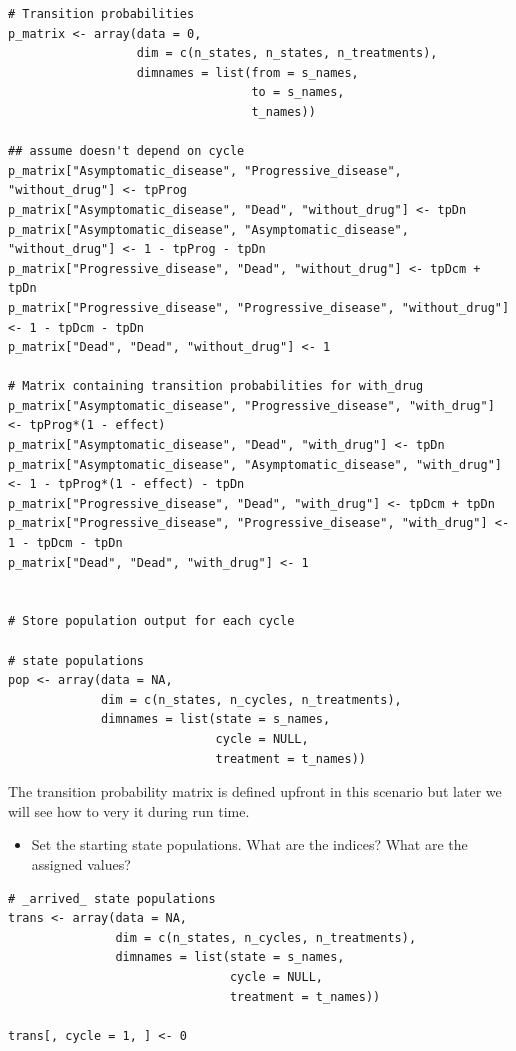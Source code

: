 \begin{verbatim}
# Transition probabilities
p_matrix <- array(data = 0,
                  dim = c(n_states, n_states, n_treatments),
                  dimnames = list(from = s_names,
                                  to = s_names,
                                  t_names))

## assume doesn't depend on cycle
p_matrix["Asymptomatic_disease", "Progressive_disease", "without_drug"] <- tpProg
p_matrix["Asymptomatic_disease", "Dead", "without_drug"] <- tpDn
p_matrix["Asymptomatic_disease", "Asymptomatic_disease", "without_drug"] <- 1 - tpProg - tpDn
p_matrix["Progressive_disease", "Dead", "without_drug"] <- tpDcm + tpDn
p_matrix["Progressive_disease", "Progressive_disease", "without_drug"] <- 1 - tpDcm - tpDn
p_matrix["Dead", "Dead", "without_drug"] <- 1

# Matrix containing transition probabilities for with_drug
p_matrix["Asymptomatic_disease", "Progressive_disease", "with_drug"] <- tpProg*(1 - effect)
p_matrix["Asymptomatic_disease", "Dead", "with_drug"] <- tpDn
p_matrix["Asymptomatic_disease", "Asymptomatic_disease", "with_drug"] <- 1 - tpProg*(1 - effect) - tpDn
p_matrix["Progressive_disease", "Dead", "with_drug"] <- tpDcm + tpDn
p_matrix["Progressive_disease", "Progressive_disease", "with_drug"] <- 1 - tpDcm - tpDn
p_matrix["Dead", "Dead", "with_drug"] <- 1


# Store population output for each cycle 

# state populations
pop <- array(data = NA,
             dim = c(n_states, n_cycles, n_treatments),
             dimnames = list(state = s_names,
                             cycle = NULL,
                             treatment = t_names))
\end{verbatim}

The transition probability matrix is defined upfront in this scenario but later we will see how to very it during run time.

\begin{itemize}
\item Set the starting state populations. What are the indices? What are the assigned values?
\end{itemize}

\begin{verbatim}
# _arrived_ state populations
trans <- array(data = NA,
               dim = c(n_states, n_cycles, n_treatments),
               dimnames = list(state = s_names,
                               cycle = NULL,
                               treatment = t_names))

trans[, cycle = 1, ] <- 0
\end{verbatim}

